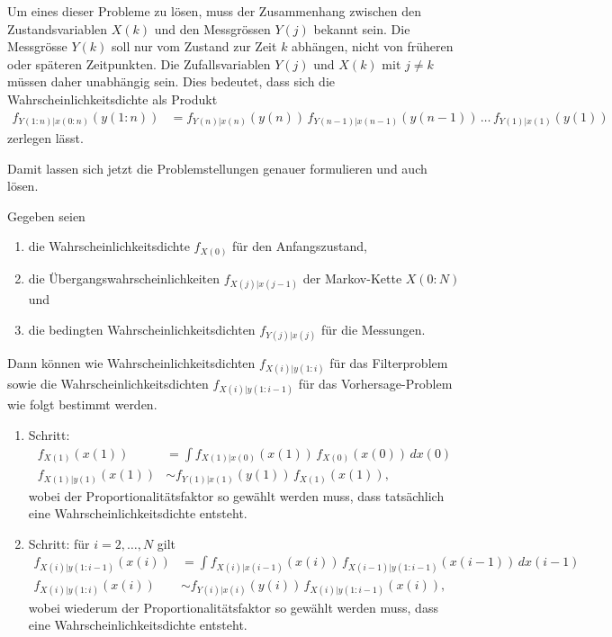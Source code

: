 Um eines dieser Probleme zu lösen, muss der Zusammenhang zwischen den
Zustandsvariablen $X(k)$ und den Messgrössen $Y(j)$ bekannt sein.
Die Messgrösse $Y(k)$ soll nur vom Zustand zur Zeit $k$ abhängen,
nicht von früheren oder späteren Zeitpunkten.
Die Zufallsvariablen $Y(j)$ und $X(k)$ mit $j\ne k$ müssen daher
unabhängig sein.
Dies bedeutet, dass sich die Wahrscheinlichkeitsdichte als Produkt
\begin{align*}
f_{Y(1:n)|x(0:n)} (y(1:n))
&=
f_{Y(n)|x(n)}(y(n))\,
f_{Y(n-1)|x(n-1)}(y(n-1))\,
\dots\,
f_{Y(1)|x(1)}(y(1))
\end{align*}
zerlegen lässt.

Damit lassen sich jetzt die Problemstellungen genauer formulieren 
und auch lösen.

\begin{satz}
\label{satz:filter und vorhersage}
Gegeben seien
\begin{enumerate}
\item die Wahrscheinlichkeitsdichte $f_{X(0)}$ für den Anfangszustand,
\item die Übergangswahrscheinlichkeiten $f_{X(j)|x(j-1)}$ der
Markov-Kette $X(0:N)$ und
\item die bedingten Wahrscheinlichkeitsdichten $f_{Y(j)|x(j)}$ für die
Messungen.
\end{enumerate}
Dann können wie Wahrscheinlichkeitsdichten $f_{X(i)|y(1:i)}$ für das
Filterproblem sowie die Wahrscheinlichkeitsdichten $f_{X(i)|y(1:i-1)}$
für das Vorhersage-Problem wie folgt bestimmt werden.
\begin{enumerate}
\item Schritt:
\begin{align}
f_{X(1)}(x(1))
&=
\int f_{X(1)|x(0)}(x(1)) \, f_{X(0)}(x(0))\, dx(0)
\label{assim:totalstep1}
\\
f_{X(1)|y(1)}(x(1))
&\sim
f_{Y(1)|x(1)}(y(1))\, f_{X(1)}(x(1)),
\label{assim:bayesstep1}
\end{align}
wobei der Proportionalitätsfaktor so gewählt werden muss, dass tatsächlich
eine Wahrscheinlichkeitsdichte entsteht.
\item Schritt: für $i=2,\dots,N$ gilt
\begin{align}
f_{X(i)|y(1:i-1)}(x(i))
&=
\int f_{X(i)|x(i-1)}(x(i))\, f_{X(i-1)|y(1:i-1)}(x(i-1))\,dx(i-1)
\label{assim:totalstep2}
\\
f_{X(i)|y(1:i)}(x(i))
&\sim
f_{Y(i)|x(i)}(y(i))\, f_{X(i)|y(1:i-1)}(x(i)),
\label{assim:bayesstep2}
\end{align}
wobei wiederum der Proportionalitätsfaktor so gewählt werden muss, dass
eine Wahrscheinlichkeitsdichte entsteht.
\end{enumerate}
\end{satz}

